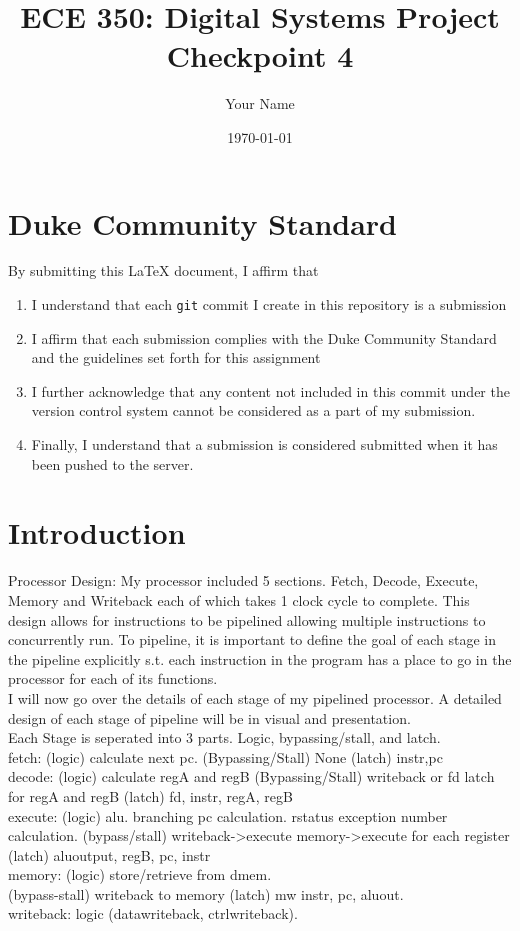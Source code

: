\documentclass[letterpaper]{article} %
\begin{document}
\title{ECE 350: Digital Systems Project Checkpoint 4}
\author{Your Name} %
\date{\today} %
\maketitle

\section*{Duke Community Standard}

By submitting this \LaTeX{} document, I affirm that
\begin{enumerate}
    \item I understand that each \texttt{git} commit I create in this repository is a submission
    \item I affirm that each submission complies with the Duke Community Standard and the guidelines set forth for this assignment
    \item I further acknowledge that any content not included in this commit under the version control system cannot be considered as a part of my submission.
    \item Finally, I understand that a submission is considered submitted when it has been pushed to the server.
\end{enumerate}

\section{Introduction}
\par
    Processor Design: My processor included 5 sections. Fetch, Decode, Execute, Memory and Writeback each of which takes 1 clock cycle to complete.
    This design allows for instructions to be pipelined allowing multiple instructions to concurrently run. To pipeline, it is important to define 
    the goal of each stage in the pipeline explicitly s.t. each instruction in the program has a place to go in the processor for each of its functions.\\
    I will now go over the details of each stage of my pipelined processor. A detailed design of each stage of pipeline will be in visual and presentation. \\
    Each Stage is seperated into 3 parts. Logic, bypassing/stall, and latch. \\
    fetch: (logic) calculate next pc. (Bypassing/Stall) None  (latch) instr,pc \\
    decode: (logic) calculate regA and regB (Bypassing/Stall) writeback or fd latch for regA and regB  (latch) fd, instr, regA, regB \\
    execute: (logic) alu. branching pc calculation. rstatus exception number calculation. (bypass/stall) writeback->execute memory->execute for each register (latch) aluoutput, regB, pc, instr \\
    memory: (logic) store/retrieve from dmem.\\ (bypass-stall) writeback to memory (latch) mw instr, pc, aluout. \\
    writeback: logic (datawriteback, ctrlwriteback). \\
\end{document}

